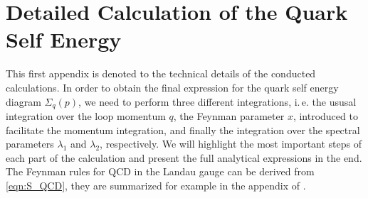 \chapter{Detailed Calculation of the Quark Self Energy}\label{chap:appendixA}
This first appendix is denoted to the technical details of the conducted calculations. In order to obtain the final expression  for the quark self energy diagram $\Sigma_q(p)$, we need to perform three different integrations, i.\,e. the ususal integration over the loop momentum $q$, the Feynman parameter $x$, introduced to facilitate the momentum integration, and finally the integration over the spectral parameters $\lambda_1$ and $\lambda_2$, respectively. We will highlight the most important steps of each part of the calculation and present the full analytical expressions in the end.\\
The Feynman rules for QCD in the Landau gauge can be derived from \eqref{eqn:S_QCD}, they are summarized for example in the appendix of \cite{NPgaugeLecture}. 


